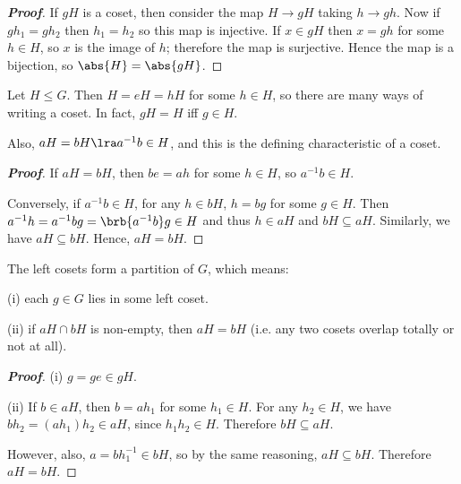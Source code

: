 \begin{proof}[\bf Proof]
If $gH$ is a coset, then consider the map $H\to gH$ taking $h\to gh$. Now if $gh_1 = gh_2$ then $h_1 = h_2$ so this map is injective. If $x \in gH$ then $x = gh$ for some $h\in H$, so $x$ is the image of $h$; therefore the map is surjective. Hence the map is a bijection, so $\abs{H} = \abs{gH}$.
\end{proof}

\begin{theorem}\label{thm:left_coset}
Let $H\leq G$. Then $H = eH = h H$ for some $h\in H$, so there are many ways of writing a coset. In fact, $gH = H$ iff $g\in H$.

Also, $aH = bH \lra a^{-1}b\in H$, and this is the defining characteristic of a coset.
\end{theorem}

\begin{proof}[\bf Proof]
If $aH=bH$, then $be = ah$ for some $h\in H$, so $a^{-1}b\in H$.

Conversely, if $a^{-1}b \in H$, for any $h\in bH$, $h = bg$ for some $g \in H$. Then $a^{-1}h = a^{-1}b g = \brb{a^{-1}b}g \in H$ and thus $h\in aH$ and $bH \subseteq aH$. Similarly, we have $aH \subseteq bH$. Hence, $aH = bH$.
\end{proof}


\begin{lemma}\label{lem:left_coset}
The left cosets form a partition of $G$, which means:
\ben
\item [(i)] each $g\in G$ lies in some left coset.
\item [(ii)] if $aH\cap bH$ is non-empty, then $aH = bH$ (i.e. any two cosets overlap totally or not at all).
\een
\end{lemma}

\begin{proof}[\bf Proof]
\ben
\item [(i)] $g=ge \in gH$.
\item [(ii)] If $b\in aH$, then $b=ah_1$ for some $h_1\in H$. For any $h_2\in H$, we have $bh_2 = (ah_1)h_2\in aH$, since $h_1h_2 \in H$. Therefore $bH \subseteq aH$.


However, also, $a= bh_1^{-1}\in bH$, so by the same reasoning, $aH \subseteq bH$. Therefore $aH = bH$.
\een
\end{proof}

